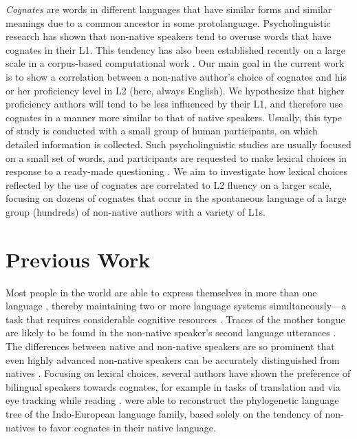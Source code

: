 \documentclass[11pt]{article}
\begin{document}
\emph{Cognates} are words in different languages that have  similar forms and similar meanings due to a common ancestor in some protolanguage. Psycholinguistic research has shown that non-native speakers tend to overuse words that have cognates in their L1.  This tendency has also been established recently on a large scale in a corpus-based computational work \citep{TACL1403}.
Our main goal in the current work is  to show a correlation between a non-native author's choice of cognates and his or her proficiency level in L2 (here, always English). 
We hypothesize that higher proficiency authors will tend to be less influenced by their L1, and therefore use cognates in a manner more similar to that of native speakers.
Usually, this type of study is conducted with a small group of human participants, on which detailed information is collected.  Such psycholinguistic studies are usually focused on a small set of words, and participants are requested to make lexical choices in response to a ready-made questioning \citep{prior:2006a,BIL:8852637}.
We aim to investigate how lexical choices reflected by the use of cognates are correlated to L2 fluency on a larger scale, focusing on dozens of cognates that occur in the spontaneous language of a large group (hundreds) of non-native authors with a variety of L1s.

\section{Previous Work}

Most people in the world are able to express themselves in more than one language \citep{grosjean2012psycholinguistics}, thereby maintaining two or more language systems simultaneously---a task that requires considerable cognitive resources  \citep{schlesinger:2003,hvelplund2014eye,Prior2014,Kroll_Bobb_Hoshino_2014}.
Traces of the mother tongue are likely to be found in the non-native speaker's second language utterances \citep{jarvis2008crosslinguistic}. The differences between native and non-native speakers are so prominent that even highly advanced non-native speakers can be accurately distinguished from natives \citep{tomokiyo2001you,bergsma2012stylometric,DBLP:conf/acl/RabinovichNOW16,D18-1395}. 
Focusing on lexical choices, several authors have shown the preference of bilingual speakers towards cognates, for example in tasks of translation and via eye tracking while reading  \citep{de1992determinants, prior2011translation, libben2009bilingual,cop2017reading}. 
\citet{TACL1403} were able to reconstruct the phylogenetic language tree of the Indo-European language family, based solely on the tendency of non-natives to favor cognates in their native language.
\end{document}
